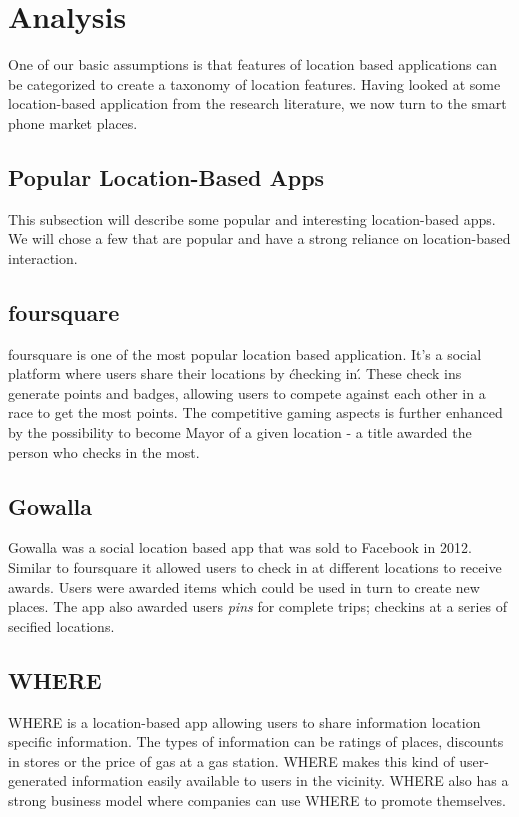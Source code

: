 \section{Analysis} %
\label{sec:analysis}
One of our basic assumptions is that features of location based applications can be categorized to create a taxonomy of location features. Having looked at some location-based application from the research literature, we now turn to the smart phone market places. 

\subsection{Popular Location-Based Apps} %
\label{sub:popular_location_based_apps}
This subsection will describe some popular and interesting location-based apps. We will chose a few that are popular and have a strong reliance on location-based interaction. 

\subsection{foursquare} %
\label{sub:foursquare}
foursquare is one of the most popular location based application. It's a social platform where users share their locations by \'checking in\'. These check ins generate points and badges, allowing users to compete against each other in a race to get the most points. The competitive gaming aspects is further enhanced by the possibility to become Mayor of a given location - a title awarded the person who checks in the most. 

\subsection{Gowalla} %
\label{sub:gowalla}
Gowalla was a social location based app that was sold to Facebook in 2012. Similar to foursquare it allowed users to check in at different locations to receive awards. Users were awarded items which could be used in turn to create new places. The app also awarded users \emph{pins} for complete trips; checkins at a series of secified locations.

\subsection{WHERE} %
\label{sub:where}
WHERE is a location-based app allowing users to share information location specific information. The types of information can be ratings of places, discounts in stores or the price of gas at a gas station. WHERE makes this kind of user-generated information easily available to users in the vicinity. WHERE also has a strong business model where companies can use WHERE to promote themselves. 

